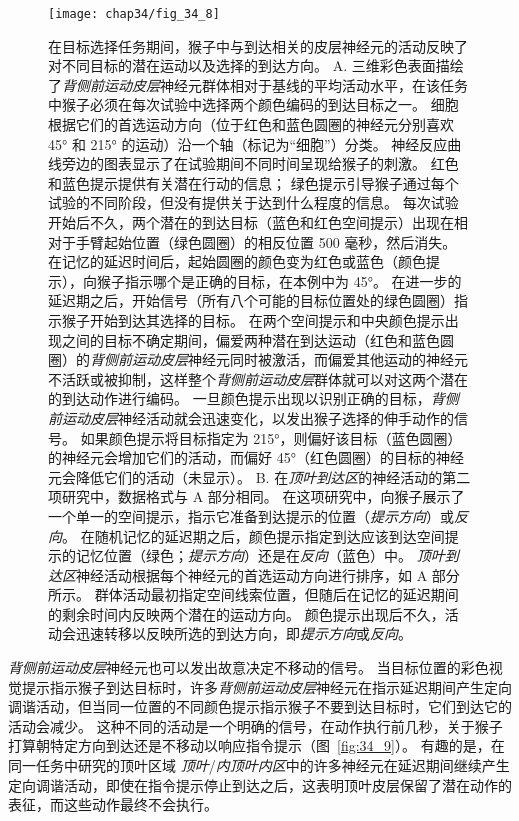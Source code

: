 \begin{figure}[htbp]
	\centering
	\texttt{[image: chap34/fig\_34\_8]}
	\caption{在目标选择任务期间，猴子中与到达相关的皮层神经元的活动反映了对不同目标的潜在运动以及选择的到达方向。
		A. 三维彩色表面描绘了\textit{背侧前运动皮层}神经元群体相对于基线的平均活动水平，在该任务中猴子必须在每次试验中选择两个颜色编码的到达目标之一。
		细胞根据它们的首选运动方向（位于红色和蓝色圆圈的神经元分别喜欢 45° 和 215° 的运动）沿一个轴（标记为“细胞”）分类。
		神经反应曲线旁边的图表显示了在试验期间不同时间呈现给猴子的刺激。
		红色和蓝色提示提供有关潜在行动的信息；
		绿色提示引导猴子通过每个试验的不同阶段，但没有提供关于达到什么程度的信息。
		每次试验开始后不久，两个潜在的到达目标（蓝色和红色空间提示）出现在相对于手臂起始位置（绿色圆圈）的相反位置 500 毫秒，然后消失。
		在记忆的延迟时间后，起始圆圈的颜色变为红色或蓝色（颜色提示），向猴子指示哪个是正确的目标，在本例中为 45°。
		在进一步的延迟期之后，开始信号（所有八个可能的目标位置处的绿色圆圈）指示猴子开始到达其选择的目标。
		在两个空间提示和中央颜色提示出现之间的目标不确定期间，偏爱两种潜在到达运动（红色和蓝色圆圈）的\textit{背侧前运动皮层}神经元同时被激活，而偏爱其他运动的神经元不活跃或被抑制，这样整个\textit{背侧前运动皮层}群体就可以对这两个潜在的到达动作进行编码。
		一旦颜色提示出现以识别正确的目标，\textit{背侧前运动皮层}神经活动就会迅速变化，以发出猴子选择的伸手动作的信号。
		如果颜色提示将目标指定为 215°，则偏好该目标（蓝色圆圈）的神经元会增加它们的活动，而偏好 45°（红色圆圈）的目标的神经元会降低它们的活动（未显示）\cite{cisek2010neural}。
		B. 在\textit{顶叶到达区}的神经活动的第二项研究中，数据格式与 A 部分相同。
		在这项研究中，向猴子展示了一个单一的空间提示，指示它准备到达提示的位置（\textit{提示方向}）或\textit{反向}。
		在随机记忆的延迟期之后，颜色提示指定到达应该到达空间提示的记忆位置（绿色；\textit{提示方向}）还是在\textit{反向}（蓝色）中。
		\textit{顶叶到达区}神经活动根据每个神经元的首选运动方向进行排序，如 A 部分所示。
		群体活动最初指定空间线索位置，但随后在记忆的延迟期间的剩余时间内反映两个潜在的运动方向。
		颜色提示出现后不久，活动会迅速转移以反映所选的到达方向，即\textit{提示方向}或\textit{反向}\cite{klaes2011choosing}。}
	\label{fig:34_8}
\end{figure}


\textit{背侧前运动皮层}神经元也可以发出故意决定不移动的信号。
当目标位置的彩色视觉提示指示猴子到达目标时，许多\textit{背侧前运动皮层}神经元在指示延迟期间产生定向调谐活动，但当同一位置的不同颜色提示指示猴子不要到达目标时，它们到达它的活动会减少。
这种不同的活动是一个明确的信号，在动作执行前几秒，关于猴子打算朝特定方向到达还是不移动以响应指令提示（图~\ref{fig:34_9}）。
有趣的是，在同一任务中研究的顶叶区域 \textit{顶叶}/\textit{内顶叶内区}中的许多神经元在延迟期间继续产生定向调谐活动，即使在指令提示停止到达之后，这表明顶叶皮层保留了潜在动作的表征，而这些动作最终不会执行。


